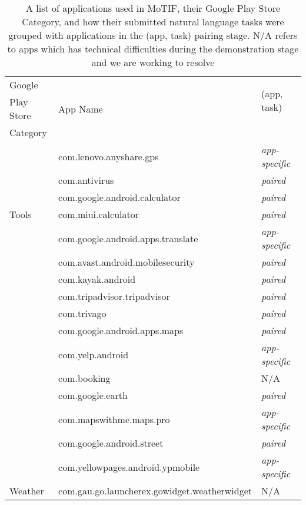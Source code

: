 \begin{table}
    \centering
        \caption{A list of applications used in MoTIF, their Google Play Store Category, and how their submitted natural language tasks were grouped with applications in the (app, task) pairing stage. N/A refers to apps which has technical difficulties during the demonstration stage and we are working to resolve}
    \begin{tabular}{|l|l|l|}
    \hline
         Google  & \multirow{3}{*}{App Name} & \multirow{2}{*}{(app, task)}  \\
         Play Store & & \multirow{2}{*}{Pairing Method} \\
         Category &  &  \\
         \hline
          \multirow{7}{*}{Tools}&  com.lenovo.anyshare.gps& \textit{app-specific}\\ \cline{2-3}
         & com.antivirus& \textit{paired} \\ \cline{2-3}
       &  com.google.android.calculator& \textit{paired}\\ \cline{2-3}
         & com.miui.calculator& \textit{paired}\\ \cline{2-3}
        & com.google.android.apps.translate& \textit{app-specific}\\ \cline{2-3}
       & com.avast.android.mobilesecurity & \textit{paired}\\
       \hline
       \multirow{9}{*}{Travel}&  com.kayak.android& \textit{paired} \\ \cline{2-3}
         & com.tripadvisor.tripadvisor& \textit{paired}\\ \cline{2-3}
         & com.trivago& \textit{paired}\\ \cline{2-3}
         & com.google.android.apps.maps& \textit{paired}\\ \cline{2-3}
         & com.yelp.android& \textit{app-specific}\\ \cline{2-3}
         & com.booking& N/A \\ \cline{2-3}
         & com.google.earth& \textit{paired} \\ \cline{2-3}
         & com.mapswithme.maps.pro& \textit{app-specific}\\ \cline{2-3}
         & com.google.android.street& \textit{paired}\\ \cline{2-3}
        & com.yellowpages.android.ypmobile & \textit{app-specific}\\
       \hline
      \multirow{9}{*}{Weather} &  com.gau.go.launcherex.gowidget.weatherwidget& N/A \\ \cline{2-3}

\end{tabular}
\end{table}
